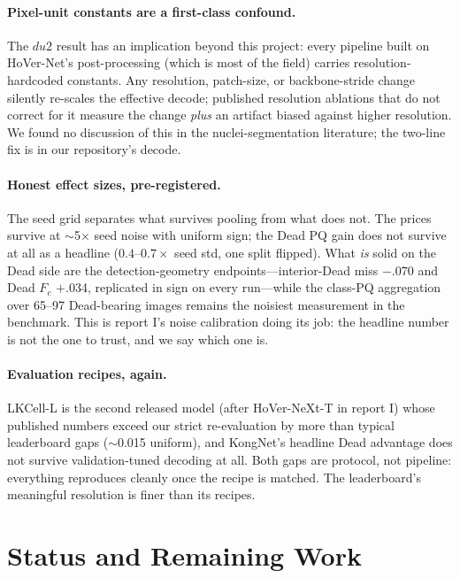 \documentclass[11pt]{article}
\begin{document}
\paragraph{Pixel-unit constants are a first-class confound.} The $du2$ result has an
implication beyond this project: every pipeline built on HoVer-Net's post-processing (which
is most of the field) carries resolution-hardcoded constants. Any resolution, patch-size, or
backbone-stride change silently re-scales the effective decode; published resolution
ablations that do not correct for it measure the change \emph{plus} an artifact biased
against higher resolution. We found no discussion of this in the nuclei-segmentation
literature; the two-line fix is in our repository's decode.

\paragraph{Honest effect sizes, pre-registered.} The seed grid separates what survives
pooling from what does not. The prices survive at $\sim$5$\times$ seed noise with uniform
sign; the Dead PQ gain does not survive at all as a headline ($0.4$--$0.7\times$ seed std,
one split flipped). What \emph{is} solid on the Dead side are the detection-geometry
endpoints---interior-Dead miss $-$.070 and Dead $F_c$ $+$.034, replicated in sign on every
run---while the class-PQ aggregation over 65--97 Dead-bearing images remains the noisiest
measurement in the benchmark. This is report I's noise calibration doing its job: the
headline number is not the one to trust, and we say which one is.

\paragraph{Evaluation recipes, again.} LKCell-L is the second released model (after
HoVer-NeXt-T in report I) whose published numbers exceed our strict re-evaluation by more
than typical leaderboard gaps ($\sim$0.015 uniform), and KongNet's headline Dead advantage
does not survive validation-tuned decoding at all. Both gaps are protocol, not pipeline:
everything reproduces cleanly once the recipe is matched. The leaderboard's meaningful
resolution is finer than its recipes.

\section{Status and Remaining Work}
\label{sec:status}
\end{document}
